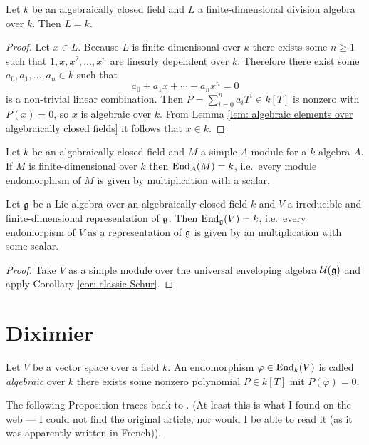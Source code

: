 \begin{cor}
 Let $k$ be an algebraically closed field and $L$ a finite-dimensional division algebra over $k$. Then $L = k$.
\end{cor}
\begin{proof}
 Let $x \in L$. Because $L$ is finite-dimenisonal over $k$ there exists some $n \geq 1$ such that $1, x, x^2, \dotsc, x^n$ are linearly dependent over $k$. Therefore there exist some $a_0, a_1, \dotsc, a_n \in k$ such that
 \[
  a_0 + a_1 x + \dotsb + a_n x^n = 0
 \]
 is a non-trivial linear combination. Then $P = \sum_{i=0}^n a_i T^i \in k[T]$ is nonzero with $P(x) = 0$, so $x$ is algebraic over $k$. From Lemma \ref{lem: algebraic elements over algebraically closed fields} it follows that $x \in k$.
\end{proof}


\begin{cor} \label{cor: classic Schur}
 Let $k$ be an algebraically closed field and $M$ a simple $A$-module for a $k$-algebra $A$. If $M$ is finite-dimensional over $k$ then $\operatorname{End}_A(M) = k$, i.e.\ every module endomorphism of $M$ is given by multiplication with a scalar.
\end{cor}


\begin{cor}
 Let $\mathfrak{g}$ be a Lie algebra over an algebraically closed field $k$ and $V$ a irreducible and finite-dimensional representation of $\mathfrak{g}$. Then $\operatorname{End}_{\mathfrak{g}}(V) = k$, i.e.\ every endomorpism of $V$ as a representation of $\mathfrak{g}$ is given by an multiplication with some scalar.
\end{cor}
\begin{proof}
 Take $V$ as a simple module over the universal enveloping algebra $\mathcal{U}(\mathfrak{g})$ and apply Corollary \ref{cor: classic Schur}.
\end{proof}





\section{Diximier}


\begin{defi}
 Let $V$ be a vector space over a field $k$. An endomorphism $\varphi \in \operatorname{End}_k(V)$ is called \emph{algebraic} over $k$ there exists some nonzero polynomial $P \in k[T]$ mit $P(\varphi) = 0$.
\end{defi}


The following Proposition traces back to \cite{Dixmier}. (At least this is what I found on the web --- I could not find the original article, nor would I be able to read it (as it was apparently written in French)).


